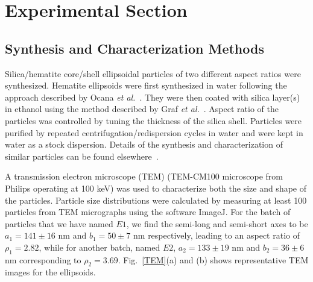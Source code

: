 \documentclass[aps,prl,preprint,superscriptaddress]{revtex4-1} %
\begin{document}
\section{Experimental Section}
\subsection{Synthesis and Characterization Methods}
Silica/hematite core/shell ellipsoidal particles of two different aspect ratios were synthesized. Hematite ellipsoids were first synthesized in water following the approach described by Ocana \emph{et al.}~\cite{ocana1999homogeneous}. They were then coated with silica layer(s) in ethanol using the method described by Graf \emph{et al.}~\cite{graf2003general}. Aspect ratio of the particles was controlled by tuning the thickness of the silica shell. Particles were purified by repeated centrifugation/redispersion cycles in water and were kept in water as a stock dispersion. Details of the synthesis and characterization of similar particles can be found elsewhere~\cite{reufer2010morphology}.\par
A transmission electron microscope (TEM) (TEM-CM100 microscope from Philips operating at 100 keV) was used to characterize both the size and shape of the particles. Particle size distributions were calculated by measuring at least 100 particles from TEM micrographs using the software ImageJ. For the batch of particles that we have named $E1$, we find the semi-long and semi-short axes to be $a_1 = 141\pm 16$ nm and $b_1 = 50 \pm 7$ nm respectively, leading to an aspect ratio of $\rho_1 = 2.82$, while for another batch, named $E2$, $a_2 = 133 \pm 19$ nm and $b_2 = 36 \pm 6$ nm corresponding to $\rho_2 = 3.69$. Fig.~\ref{TEM}(a) and (b) shows representative TEM images for the ellipsoids.
\end{document}
